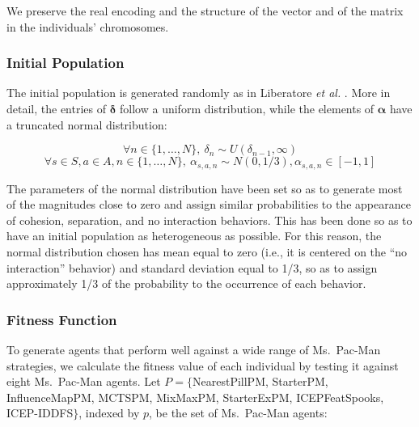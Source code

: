 \documentclass[journal]{IEEEtran}
\begin{document}
We preserve the real encoding and the structure of the vector and of the matrix in the individuals' chromosomes.

\subsubsection{Initial Population}
The initial population is generated randomly as in Liberatore \emph{et al.} \cite{Liberatore2014}. More in detail, the entries of $\boldsymbol\delta$ follow a uniform distribution, while the elements of $\boldsymbol\alpha$ have a truncated normal distribution:

\begin{small}
\begin{equation}
	\label{eq:init_radius}
	\forall n \in \{1, \ldots, N\}, \: \delta_n \sim U(\delta_{n-1},\infty)
\end{equation}
\begin{equation}
	\label{eq:init_magnitude}
	\forall s \in S, a \in A,  n \in \{1, \ldots, N\}, \: \alpha_{s,a,n} \sim N(0,1/3), \alpha_{s,a,n} \in [-1,1]
\end{equation}
\end{small}

The parameters of the normal distribution have been set so as to generate most of the magnitudes close to zero and assign similar probabilities to the appearance of cohesion, separation, and no interaction behaviors. This has been done so as to have an initial population as heterogeneous as possible. For this reason, the normal distribution chosen has mean equal to zero (i.e., it is centered on the “no interaction” behavior) and standard deviation equal to 1/3, so as to assign approximately 1/3 of the probability to the occurrence of each behavior.

\subsubsection{Fitness Function}
To generate agents that perform well against a wide range of Ms.\  Pac-Man strategies, we calculate the fitness value of each individual by testing it against eight Ms.\  Pac-Man agents. Let $P=\{$NearestPillPM, StarterPM, InfluenceMapPM, MCTSPM, MixMaxPM, StarterExPM, ICEPFeatSpooks, ICEP-IDDFS$\}$, indexed by $p$, be the set of Ms.\  Pac-Man agents:
\end{document}
